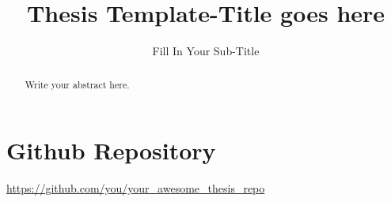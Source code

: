 \documentclass[ds]{mscthesis}
\title{Thesis Template-Title goes here}
\subtitle{Fill In Your Sub-Title}
\begin{document}
\pagestyle{plain}

\maketitlepage
\fixemptypage
\setcounter{page}{0}

\begin{abstract}
Write your abstract here.
\end{abstract}

\maketitle

\section*{Github Repository}
\url{https://github.com/you/your_awesome_thesis_repo}











\newpage

\end{document}
